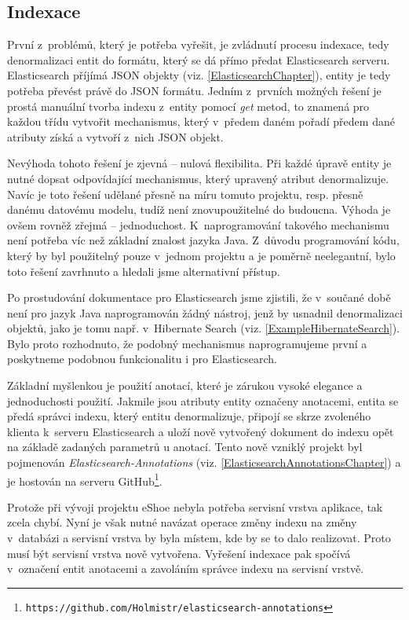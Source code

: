 \documentclass[11pt,oneside]{fithesis2}
\begin{document}
\subsection{Indexace}
\label{NavrhIndexace}
První z~problémů, který je potřeba vyřešit, je zvládnutí procesu indexace, tedy denormalizaci entit do formátu, který se dá přímo předat Elasticsearch serveru. Elasticsearch příjímá JSON objekty (viz. \ref{ElasticsearchChapter}), entity je tedy potřeba převést právě do JSON formátu. Jedním z~prvních možných řešení je prostá manuální tvorba indexu z~entity pomocí \emph{get} metod, to znamená pro každou třídu vytvořit mechanismus, který v~předem daném pořadí předem dané atributy získá a vytvoří z~nich JSON objekt.

Nevýhoda tohoto řešení je zjevná -- nulová flexibilita. Při každé úpravě entity je nutné dopsat odpovídající mechanismus, který upravený atribut denormalizuje. Navíc je toto řešení udělané přesně na míru tomuto projektu, resp. přesně danému datovému modelu, tudíž není znovupoužitelné do budoucna. Výhoda je ovšem rovněž zřejmá -- jednoduchost. K~naprogramování takového mechanismu není potřeba víc než základní znalost jazyka Java. Z~důvodu programování kódu, který by byl použitelný pouze v~jednom projektu a je poměrně neelegantní, bylo toto řešení zavrhnuto a hledali jsme alternativní přístup.

Po prostudování dokumentace pro Elasticsearch jsme zjistili, že v~součané době není pro jazyk Java naprogramován žádný nástroj, jenž by usnadnil denormalizaci objektů, jako je tomu např. v~Hibernate Search (viz. \ref{ExampleHibernateSearch}). Bylo proto rozhodnuto, že podobný mechanismus naprogramujeme první a poskytneme podobnou funkcionalitu i pro Elasticsearch.

Základní myšlenkou je použití anotací, které je zárukou vysoké elegance a jednoduchosti použití. Jakmile jsou atributy entity označeny anotacemi, entita se předá správci indexu, který entitu denormalizuje, připojí se skrze zvoleného klienta k~serveru Elasticsearch a uloží nově vytvořený dokument do indexu opět na základě zadaných parametrů u anotací. Tento nově vzniklý projekt byl pojmenován \emph{Elasticsearch-Annotations} (viz. \ref{ElasticsearchAnnotationsChapter}) a je hostován na serveru GitHub\footnote{\texttt{https://github.com/Holmistr/elasticsearch-annotations}}.

Protože při vývoji projektu eShoe nebyla potřeba servisní vrstva aplikace, tak zcela chybí. Nyní je však nutné navázat operace změny indexu na změny v~databázi a servisní vrstva by byla místem, kde by se to dalo realizovat. Proto musí být servisní vrstva nově vytvořena. Vyřešení indexace pak spočívá v~označení entit anotacemi a zavoláním správce indexu na servisní vrstvě. 
\end{document}
